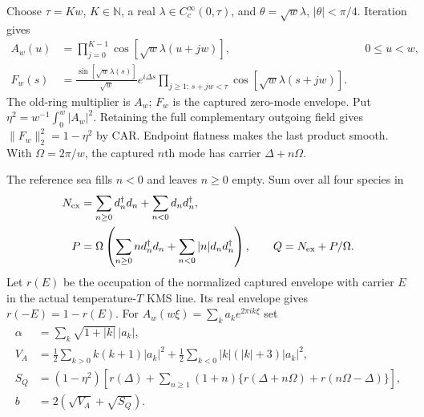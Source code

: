 Choose $\tau=Kw$, $K\in\mathbb N$, a real
$\lambda\in C_c^\infty(0,\tau)$, and
$\theta=\sqrt w\lambda$, $|\theta|<\pi/4$. Iteration gives
\begin{align}
 A_w(u)&=\prod_{j=0}^{K-1}\cos[\sqrt w\lambda(u+jw)],
                         &&0\le u<w,\\
 F_w(s)&=\frac{\sin[\sqrt w\lambda(s)]}{\sqrt w}e^{i\Delta s}
          \prod_{j\ge1:\,s+jw<\tau}\cos[\sqrt w\lambda(s+jw)].
 \label{eq:ring-envelopes}
\end{align}
The old-ring multiplier is $A_w$; $F_w$ is the captured zero-mode
envelope. Put $\eta^2=w^{-1}\int_0^w|A_w|^2$. Retaining the full
complementary outgoing field gives $\|F_w\|_2^2=1-\eta^2$ by CAR.
Endpoint flatness makes the last product smooth. With $\Omega=2\pi/w$,
the captured $n$th mode has carrier $\Delta+n\Omega$.

The reference sea fills $n<0$ and leaves $n\ge0$ empty. Sum over all
four species in
\begin{align}
 N_{\rm ex}&=\sum_{n\ge0}d_n^\dagger d_n+\sum_{n<0}d_nd_n^\dagger,\\
 P&=\Omega\left(\sum_{n\ge0}n d_n^\dagger d_n+
                      \sum_{n<0}|n|d_nd_n^\dagger\right),
 \qquad Q=N_{\rm ex}+P/\Omega .
\end{align}
Let $r(E)$ be the occupation of the normalized captured envelope with
carrier $E$ in the actual temperature-$T$ KMS line. Its real envelope
gives $r(-E)=1-r(E)$. For $A_w(w\xi)=\sum_k a_ke^{2\pi ik\xi}$ set
\begin{align}
 \alpha&=\sum_k\sqrt{1+|k|}\,|a_k|,\\
 V_A&=\tfrac12\sum_{k>0}k(k+1)|a_k|^2
       +\tfrac12\sum_{k<0}|k|(|k|+3)|a_k|^2,\\
 S_Q&=(1-\eta^2)\left[r(\Delta)+\sum_{n\ge1}(1+n)
                \{r(\Delta+n\Omega)+r(n\Omega-\Delta)\}\right],\\
 b&=2(\sqrt{V_A}+\sqrt{S_Q}).
 \label{eq:ring-constants}
\end{align}

